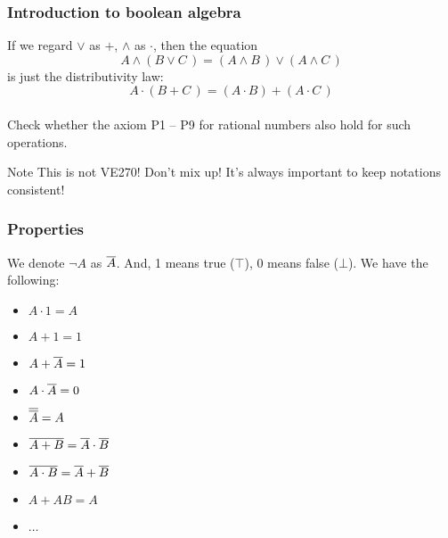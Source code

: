 \documentclass[xcolor=table]{beamer}
\begin{document}
\begin{frame}
    \frametitle{Introduction to boolean algebra}
    \vv
    If we regard $\vee$ as $+$, $\wedge$ as $\cdot$, then the equation 
        $$A\wedge(B\vee C\,)=(A\wedge B\,)\vee(A\wedge C\,)$$
    is just the distributivity law:
        $$A \cdot (B+C\,) = (A\cdot B) + (A \cdot C\,)$$
    \vv
    \textbf{\textit{}}\\
    Check whether the axiom P1 -- P9 for rational numbers also hold for such operations.
    \begin{block}{Note}
        \hspace{2em}
        This is not VE270! Don't mix up! It's always important to keep notations consistent!
    \end{block}
\end{frame}
\begin{frame}
    \frametitle{Properties}
    \hh
    We denote $\neg A$ as $\overline{A}$.
    And, 1 means true ($\top$), 0 means false ($\bot$). 
    We have the following: \vv
    \begin{itemize}
        \item $A \cdot 1 = A$
        \item $A + 1 = 1$
        \item $A + \overline{A} = 1$
        \item $A \cdot \overline{A} = 0$
        \item $\overline{\overline{A}}=A$
        \item $\overline{A+B}=\overline{A}\cdot \overline{B}$
        \item $\overline{A\cdot B}=\overline{A}+ \overline{B}$
        \item $A+AB=A$
        \item $\dots$
    \end{itemize}

\end{frame}
\end{document}
